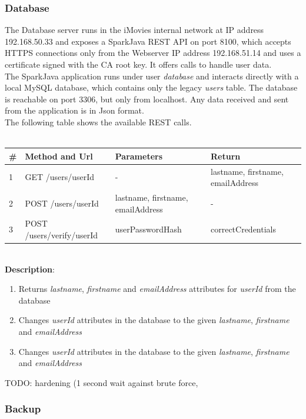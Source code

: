 \documentclass[english]{article}
\begin{document}
\subsubsection{Database}
The Database server runs in the iMovies internal network at IP address 192.168.50.33 and exposes a SparkJava REST API on port 8100, which accepts HTTPS connections only from the Webserver IP address 192.168.51.14 and uses a certificate signed with the CA root key. It offers calls to handle user data.\\
The SparkJava application runs under user \emph{database} and interacts directly with a local MySQL database, which contains only the legacy \emph{users} table. The database is reachable on port 3306, but only from localhost. Any data received and sent from the application is in Json format.\\
The following table shows the available REST calls.\\
\\
\begin{tabular} {| p{} | p{} | p{} | p{} |}
\hline
\textbf{\#} & \textbf{Method and Url} & \textbf{Parameters} & \textbf{Return}\\
\hline
1 & GET /users/userId & - & lastname, firstname, emailAddress\\
\hline
2 & POST /users/userId & lastname, firstname, emailAddress & -\\
\hline
3 & POST /users/verify/userId & userPasswordHash & correctCredentials\\
\hline
\end{tabular}
\\
\textbf{Description}:
\begin{enumerate}
\item Returns \emph{lastname}, \emph{firstname} and \emph{emailAddress} attributes for \emph{userId} from the database
\item Changes \emph{userId} attributes in the database to the given \emph{lastname}, \emph{firstname} and \emph{emailAddress}
\item Changes \emph{userId} attributes in the database to the given \emph{lastname}, \emph{firstname} and \emph{emailAddress}
\end{enumerate}

TODO: hardening (1 second wait against brute force,

\subsubsection{Backup}
\end{document}
